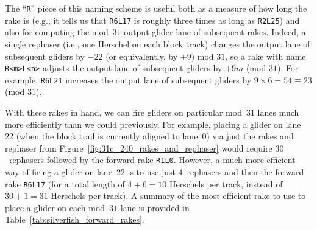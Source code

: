 The ``\texttt{R}'' piece of this naming scheme is useful both as a measure of how long the rake is (e.g., it tells us that \texttt{R6L17} is roughly three times as long as \texttt{R2L25}) and also for computing the mod~$31$ output glider lane of subsequent rakes. Indeed, a single rephaser (i.e., one Herschel on each block track) changes the output lane of subsequent gliders by $-22$ (or equivalently, by $+9$) mod $31$, so a rake with name \texttt{R<m>L<n>} adjusts the output lane of subsequent gliders by $+9m$ (mod $31$). For example, \texttt{R6L21} increases the output lane of subsequent gliders by $9 \times 6 = 54 \equiv 23$ (mod $31$).

With these rakes in hand, we can fire gliders on particular mod~$31$ lanes much more efficiently than we could previously. For example, placing a glider on lane~$22$ (when the block trail is currently aligned to lane~$0$) via just the rakes and rephaser from Figure~\ref{fig:31c_240_rakes_and_rephaser} would require $30$~rephasers followed by the forward rake \texttt{R1L0}. However, a much more efficient way of firing a glider on lane~$22$ is to use just $4$~rephasers and then the forward rake \texttt{R6L17} (for a total length of $4 + 6 = 10$ Herschels per track, instead of $30 + 1 = 31$ Herschels per track). A summary of the most efficient rake to use to place a glider on each mod~$31$ lane is provided in Table~\ref{tab:silverfish_forward_rakes}.

